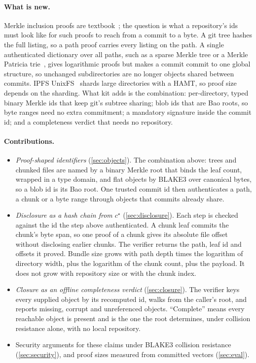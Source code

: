 \documentclass[10pt,letterpaper]{article}
\theoremstyle{remark}
\newcommand{\kit}{\textsf{kit}}
\begin{document}
\paragraph{What is new.}
Merkle inclusion proofs are textbook~\cite{merkle1987,rfc6962}; the question is
what a repository's ids must look like for such proofs to reach from a commit
to a byte. A git tree hashes the full listing, so a path proof carries every
listing on the path. A single authenticated dictionary over all paths, such as
a sparse Merkle tree or a Merkle Patricia trie~\cite{smt,ethereum}, gives
logarithmic proofs but makes a commit commit to one global structure, so
unchanged subdirectories are no longer objects shared between commits. IPFS
UnixFS~\cite{unixfs} shards large directories with a HAMT, so proof size
depends on the sharding. What \kit{} adds is the combination: per-directory,
typed binary Merkle ids that keep git's subtree sharing; blob ids that are Bao
roots, so byte ranges need no extra commitment; a mandatory signature inside
the commit id; and a completeness verdict that needs no repository.

\paragraph{Contributions.}
\begin{itemize}
  \item \emph{Proof-shaped identifiers} (\cref{sec:objects}). The combination
        above: trees and chunked files are named by a binary Merkle root that
        binds the leaf count, wrapped in a type domain, and flat objects by
        BLAKE3 over canonical bytes, so a blob id is its Bao root. One trusted
        commit id then authenticates a path, a chunk or a byte range through
        objects that commits already share.
  \item \emph{Disclosure as a hash chain from $c^\star$}
        (\cref{sec:disclosure}). Each step is checked against the id the step
        above authenticated. A chunk leaf commits the chunk's byte span, so one
        proof of a chunk gives its absolute file offset without disclosing
        earlier chunks. The verifier returns the path, leaf id and offsets it
        proved. Bundle size grows with path depth times the logarithm of
        directory width, plus the logarithm of the chunk count, plus the
        payload. It does not grow with repository size or with the chunk
        index.
  \item \emph{Closure as an offline completeness verdict}
        (\cref{sec:closure}). The verifier keys every supplied object by its
        recomputed id, walks from the caller's root, and reports missing,
        corrupt and unreferenced objects. ``Complete'' means every reachable
        object is present and is the one the root determines, under collision
        resistance alone, with no local repository.
  \item Security arguments for these claims under BLAKE3 collision resistance
        (\cref{sec:security}), and proof sizes measured from committed vectors
        (\cref{sec:eval}).
\end{itemize}
\end{document}
